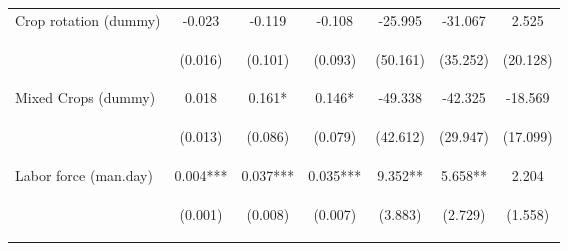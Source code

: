 \begin{center}
\begin{tabular}{lcccccc}
Crop rotation (dummy) & -0.023 & -0.119 & -0.108 & -25.995 & -31.067 & 2.525 \\
\vspace{4pt} & \begin{footnotesize}(0.016)\end{footnotesize} & \begin{footnotesize}(0.101)\end{footnotesize} & \begin{footnotesize}(0.093)\end{footnotesize} & \begin{footnotesize}(50.161)\end{footnotesize} & \begin{footnotesize}(35.252)\end{footnotesize} & \begin{footnotesize}(20.128)\end{footnotesize} \\
Mixed Crops (dummy) & 0.018 & 0.161* & 0.146* & -49.338 & -42.325 & -18.569 \\
\vspace{4pt} & \begin{footnotesize}(0.013)\end{footnotesize} & \begin{footnotesize}(0.086)\end{footnotesize} & \begin{footnotesize}(0.079)\end{footnotesize} & \begin{footnotesize}(42.612)\end{footnotesize} & \begin{footnotesize}(29.947)\end{footnotesize} & \begin{footnotesize}(17.099)\end{footnotesize} \\
Labor force (man.day) & 0.004*** & 0.037*** & 0.035*** & 9.352** & 5.658** & 2.204 \\
\vspace{4pt} & \begin{footnotesize}(0.001)\end{footnotesize} & \begin{footnotesize}(0.008)\end{footnotesize} & \begin{footnotesize}(0.007)\end{footnotesize} & \begin{footnotesize}(3.883)\end{footnotesize} & \begin{footnotesize}(2.729)\end{footnotesize} & \begin{footnotesize}(1.558)\end{footnotesize} \\

\end{tabular}
\end{center}

